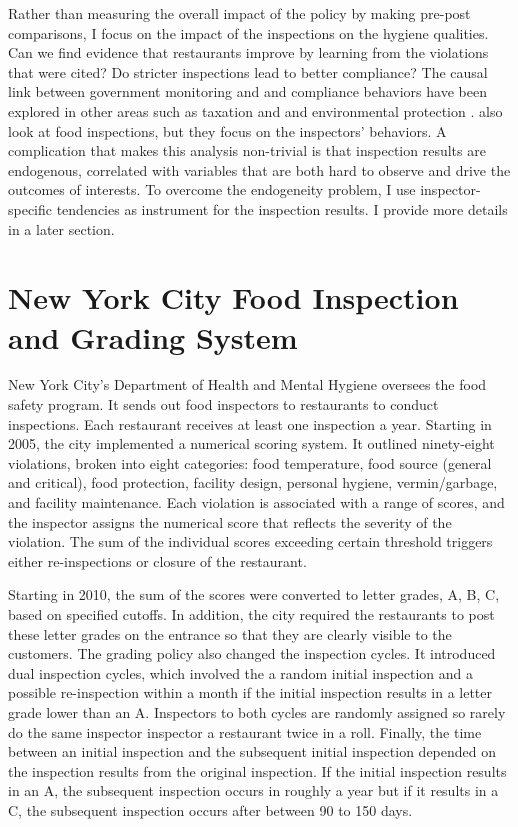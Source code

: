 \documentclass[12pt]{article}
\begin{document}
Rather than measuring the overall impact of the policy by making pre-post comparisons, I focus on the impact of the inspections on the hygiene qualities. Can we find evidence that restaurants improve by learning from the violations that were cited? Do stricter inspections lead to better compliance? The causal link between government monitoring and and compliance behaviors have been explored in other areas such as taxation \citep{Gemmell_Ratto_12} and \citep{Kleven_Waseem_13} and environmental protection \citep{Duflo_Greenstone_14}. \cite{Jin_Lee_12} also look at food inspections, but they focus on the inspectors' behaviors. A complication that makes this analysis non-trivial is that inspection results are endogenous, correlated with variables that are both hard to observe and drive the outcomes of interests. To overcome the endogeneity problem, I use inspector-specific tendencies as instrument for the inspection results. I provide more details in a later section.  

\section*{New York City Food Inspection and Grading System}

New York City's Department of Health and Mental Hygiene oversees the food safety program. It sends out food inspectors to restaurants to conduct inspections. Each restaurant receives at least one inspection a year. Starting in 2005, the city implemented a numerical scoring system. It outlined ninety-eight violations, broken into eight categories: food temperature, food source (general and critical), food protection, facility design, personal hygiene, vermin/garbage, and facility maintenance. Each violation is associated with a range of scores, and the inspector assigns the numerical score that reflects the severity of the violation. The sum of the individual scores exceeding certain threshold triggers either re-inspections or closure of the restaurant. 

Starting in 2010, the sum of the scores were converted to letter grades, A, B, C, based on specified cutoffs. In addition, the city required the restaurants to post these letter grades on the entrance so that they are clearly visible to the customers. The grading policy also changed the inspection cycles. It introduced dual inspection cycles, which involved the a random initial inspection and a possible re-inspection within a month if the initial inspection results in a letter grade lower than an A. Inspectors to both cycles are randomly assigned so rarely do the same inspector inspector a restaurant twice in a roll. Finally, the time between an initial inspection and the subsequent initial inspection depended on the inspection results from the original inspection. If the initial inspection results in an A, the subsequent inspection occurs in roughly a year but if it results in a C, the subsequent inspection occurs after between 90 to 150 days. 
\end{document}
